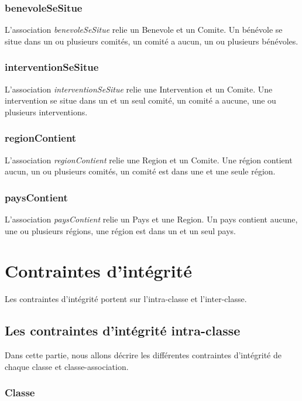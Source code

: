 \subsubsection*{benevoleSeSitue}

L'association \textit{benevoleSeSitue} relie un Benevole et un Comite. Un bénévole se situe dans un ou plusieurs comités, un comité a aucun, un ou plusieurs bénévoles.

\subsubsection*{interventionSeSitue}

L'association \textit{interventionSeSitue} relie une Intervention et un Comite. Une intervention se situe dans un et un seul comité, un comité a aucune, une ou plusieurs interventions.

\subsubsection*{regionContient}

L'association \textit{regionContient} relie une Region et un Comite. Une région contient aucun, un ou plusieurs comités, un comité est dans une et une seule région.

\subsubsection*{paysContient}

L'association \textit{paysContient} relie un Pays et une Region. Un pays contient aucune, une ou plusieurs régions, une région est dans un et un seul pays.

\section{Contraintes d'intégrité}

Les contraintes d'intégrité portent sur l'intra-classe et l'inter-classe.

\subsection{Les contraintes d'intégrité intra-classe}
Dans cette partie, nous allons décrire les différentes contraintes d'intégrité de chaque classe et classe-association.

\subsubsection{Classe} 
 
